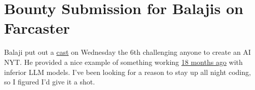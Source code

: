 \newpage
\section{Bounty Submission for Balajis on Farcaster}

Balaji put out a
\textcolor{purple}{\href{https://warpcast.com/balajis.eth/0x218b92a7}{cast}} on
Wednesday the 6th challenging anyone to create an AI NYT. He provided a nice
example of something working
\textcolor{blue}{\href{https://twitter.com/balajis/status/1601398685106991105?s=46}{18
months ago}} with inferior LLM models. I've been looking for a reason to stay up
all night coding, so I figured I'd give it a shot.
